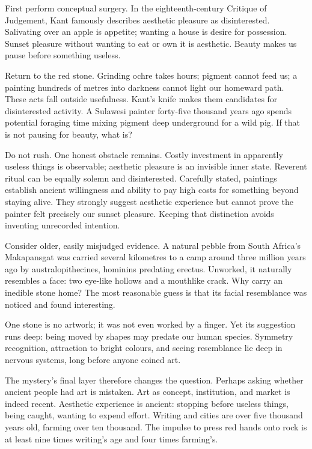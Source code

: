 First perform conceptual surgery. In the eighteenth-century Critique of Judgement, Kant famously describes aesthetic pleasure as disinterested. Salivating over an apple is appetite; wanting a house is desire for possession. Sunset pleasure without wanting to eat or own it is aesthetic. Beauty makes us pause before something useless.

Return to the red stone. Grinding ochre takes hours; pigment cannot feed us; a painting hundreds of metres into darkness cannot light our homeward path. These acts fall outside usefulness. Kant's knife makes them candidates for disinterested activity. A Sulawesi painter forty-five thousand years ago spends potential foraging time mixing pigment deep underground for a wild pig. If that is not pausing for beauty, what is?

Do not rush. One honest obstacle remains. Costly investment in apparently useless things is observable; aesthetic pleasure is an invisible inner state. Reverent ritual can be equally solemn and disinterested. Carefully stated, paintings establish ancient willingness and ability to pay high costs for something beyond staying alive. They strongly suggest aesthetic experience but cannot prove the painter felt precisely our sunset pleasure. Keeping that distinction avoids inventing unrecorded intention.

Consider older, easily misjudged evidence. A natural pebble from South Africa's Makapansgat was carried several kilometres to a camp around three million years ago by australopithecines, hominins predating erectus. Unworked, it naturally resembles a face: two eye-like hollows and a mouthlike crack. Why carry an inedible stone home? The most reasonable guess is that its facial resemblance was noticed and found interesting.

One stone is no artwork; it was not even worked by a finger. Yet its suggestion runs deep: being moved by shapes may predate our human species. Symmetry recognition, attraction to bright colours, and seeing resemblance lie deep in nervous systems, long before anyone coined art.

The mystery's final layer therefore changes the question. Perhaps asking whether ancient people had art is mistaken. Art as concept, institution, and market is indeed recent. Aesthetic experience is ancient: stopping before useless things, being caught, wanting to expend effort. Writing and cities are over five thousand years old, farming over ten thousand. The impulse to press red hands onto rock is at least nine times writing's age and four times farming's.


